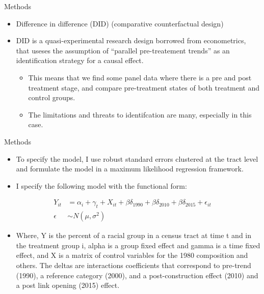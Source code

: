 \documentclass[11pt,ignorenonframetext,]{beamer}
\providecommand{\tightlist}{%
  \setlength{\itemsep}{0pt}\setlength{\parskip}{0pt}}
\begin{document}
\begin{frame}{Methods}
\protect\hypertarget{methods}{}

\begin{itemize}
\tightlist
\item
  Difference in difference (DID) (comparative counterfactual design)
\item
  DID is a quasi-experimental research design borrowed from
  econometrics, that useses the assumption of ``parallel pre-treatement
  trends'' as an identification strategy for a causal effect.

  \begin{itemize}
  \tightlist
  \item
    This means that we find some panel data where there is a pre and
    post treatment stage, and compare pre-treatment states of both
    treatment and control groups.

  \item
    The limitations and threats to identifcation are many, especially in
    this case.
  \end{itemize}
\end{itemize}

\end{frame}

\begin{frame}{Methods}
\protect\hypertarget{methods-1}{}

\begin{itemize}
\tightlist
\item
  To specify the model, I use robust standard errors clustered at the
  tract level and formulate the model in a maximum likelihood regression
  framework.
\item
  I specify the following model with the functional form:
\end{itemize}

\[
\begin{aligned}
  Y_{it} &= \alpha_i + \gamma_{t} + X_{it} +\beta{\delta_{1990}} + \beta{\delta_{2010}} + \beta{\delta_{2015}} + \epsilon_{it} \\
  \epsilon &\sim N(\mu,\sigma^2)
\end{aligned}
\]

\begin{itemize}
\tightlist
\item
  Where, Y is the percent of a racial group in a census tract at time t
  and in the treatment group i, alpha is a group fixed effect and gamma
  is a time fixed effect, and X is a matrix of control variables for the
  1980 composition and others. The deltas are interactions coefficients
  that correspond to pre-trend (1990), a reference category (2000), and
  a post-construction effect (2010) and a post link opening (2015)
  effect.
\end{itemize}

\end{frame}
\end{document}
